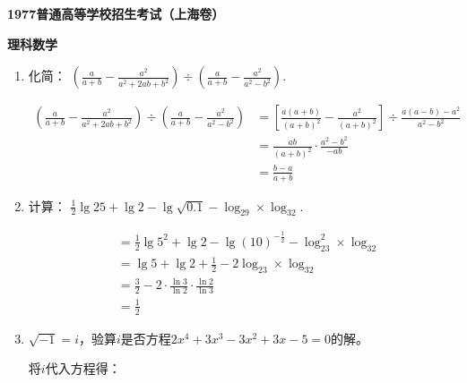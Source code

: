 \documentclass[answers]{exam}
\begin{document}
\begin{center}
	\textbf{1977普通高等学校招生考试（上海卷）}

	\textbf{\Huge 理科数学}
\end{center}
\begin{questions}
	\question
	\begin{enumerate}[label=(\arabic*)]
		\item 化简：
		      \begin{math} \displaystyle
			      \left(\frac{a}{a+b} - \frac{a^2}{a^2 + 2ab + b^2}\right) \div \left(\frac{a}{a+b} - \frac{a^2}{a^2 - b^2}\right)
		      \end{math}.
		      \begin{solution}
			      \begin{align*}
				      \left(\frac{a}{a+b} - \frac{a^2}{a^2 + 2ab + b^2}\right) \div \left(\frac{a}{a+b} - \frac{a^2}{a^2 - b^2}\right)
				       & = \left[ \frac{a(a+b)}{(a+b)^2} - \frac{a^2}{(a+b)^2} \right] \div \frac{a(a-b) - a^2}{a^2-b^2}
				      \\
				       & = \frac{ab}{(a+b)^2} \cdot \frac{a^2 - b^2}{-ab}                                                \\
				       & = \frac{b-a}{a+b}
			      \end{align*}
		      \end{solution}
		\item 计算：
		      \begin{math}
			      \displaystyle
			      \frac12\lg25+\lg2 - \lg\sqrt{0.1} - \log_29 \times \log_32.
		      \end{math}
		      \begin{solution}
			      \begin{align*}
				       & = \frac12\lg5^2 + \lg2 - \lg(10)^{-\frac12} - \log_23^2 \times \log_32 \\
				       & = \lg5 + \lg2 + \frac12 - 2 \log_23 \times \log_32                     \\
				       & = \frac32 - 2 \cdot \frac{\ln3}{\ln2}\cdot \frac{\ln2}{\ln3}           \\
				       & = \frac12
			      \end{align*}
		      \end{solution}
		\item $\sqrt{-1} = i$，验算$i$是否方程$2x^4 + 3x^3 - 3x^2 + 3x - 5 = 0$的解。
		      \begin{solution}
			      将$i$代入方程得：
			      \begin{align*}

\end{align*}
\end{solution}
\end{enumerate}
\end{questions}
\end{document}
